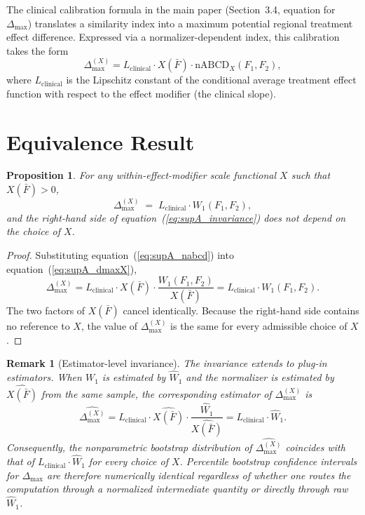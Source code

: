 \documentclass[11pt]{article}
\newtheorem{proposition}{Proposition}
\newtheorem{remark}{Remark}
\begin{document}
The clinical calibration formula in the main paper (Section~3.4, equation for $\Delta_{\max}$) translates a similarity index into a maximum potential regional treatment effect difference. Expressed via a normalizer-dependent index, this calibration takes the form
\begin{equation}
\Delta_{\max}^{(X)} = L_{\text{clinical}} \cdot X(\bar{F}) \cdot \text{nABCD}_X(F_1, F_2),
\label{eq:supA_dmaxX}
\end{equation}
where $L_{\text{clinical}}$ is the Lipschitz constant of the conditional average treatment effect function with respect to the effect modifier (the clinical slope).

\section{Equivalence Result}\label{sec:supA_main}

\begin{proposition}\label{prop:supA_equivalence}
For any within-effect-modifier scale functional $X$ such that $X(\bar{F}) > 0$,
\begin{equation}
\Delta_{\max}^{(X)} \;=\; L_{\text{clinical}} \cdot W_1(F_1, F_2),
\label{eq:supA_invariance}
\end{equation}
and the right-hand side of equation~(\ref{eq:supA_invariance}) does not depend on the choice of $X$.
\end{proposition}

\begin{proof}
Substituting equation~(\ref{eq:supA_nabcd}) into equation~(\ref{eq:supA_dmaxX}),
\[
\Delta_{\max}^{(X)} = L_{\text{clinical}} \cdot X(\bar{F}) \cdot \frac{W_1(F_1, F_2)}{X(\bar{F})} = L_{\text{clinical}} \cdot W_1(F_1, F_2).
\]
The two factors of $X(\bar{F})$ cancel identically. Because the right-hand side contains no reference to $X$, the value of $\Delta_{\max}^{(X)}$ is the same for every admissible choice of $X$.
\end{proof}

\begin{remark}[Estimator-level invariance]\label{rem:supA_estimator}
The invariance extends to plug-in estimators. When $W_1$ is estimated by $\widehat{W}_1$ and the normalizer is estimated by $\widehat{X(\bar{F})}$ from the same sample, the corresponding estimator of $\Delta_{\max}^{(X)}$ is
\[
\widehat{\Delta_{\max}^{(X)}} = L_{\text{clinical}} \cdot \widehat{X(\bar{F})} \cdot \frac{\widehat{W}_1}{\widehat{X(\bar{F})}} = L_{\text{clinical}} \cdot \widehat{W}_1.
\]
Consequently, the nonparametric bootstrap distribution of $\widehat{\Delta_{\max}^{(X)}}$ coincides with that of $L_{\text{clinical}} \cdot \widehat{W}_1$ for every choice of $X$. Percentile bootstrap confidence intervals for $\Delta_{\max}$ are therefore numerically identical regardless of whether one routes the computation through a normalized intermediate quantity or directly through raw $\widehat{W}_1$.
\end{remark}
\end{document}
